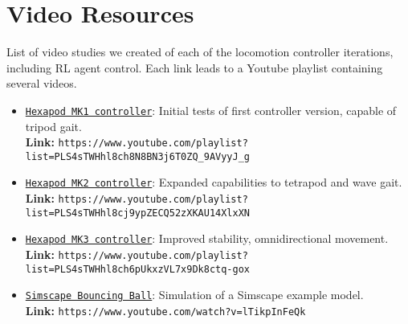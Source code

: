 \chapter*{Video Resources}

List of video studies we created of each of the locomotion controller iterations, including RL agent control.
Each link leads to a Youtube playlist containing several videos.

\begin{itemize} 
	\item \href{https://www.youtube.com/playlist?list=PLS4sTWHhl8ch8N8BN3j6T0ZQ_9AVyyJ_g}{\texttt{Hexapod MK1 controller}}: Initial tests of first controller version, capable of tripod gait. \\
																						  \textbf{Link:} \nolinkurl{https://www.youtube.com/playlist?list=PLS4sTWHhl8ch8N8BN3j6T0ZQ_9AVyyJ_g} \label{vid: MK1}
	
	\item \href{https://www.youtube.com/playlist?list=PLS4sTWHhl8cj9ypZECQ52zXKAU14XlxXN}{\texttt{Hexapod MK2 controller}}: Expanded capabilities to tetrapod and wave gait. \\
																						  \textbf{Link:} \nolinkurl{https://www.youtube.com/playlist?list=PLS4sTWHhl8cj9ypZECQ52zXKAU14XlxXN} \label{vid: MK2}
	
	\item \href{https://www.youtube.com/playlist?list=PLS4sTWHhl8ch6pUkxzVL7x9Dk8ctq-gox}{\texttt{Hexapod MK3 controller}}: Improved stability, omnidirectional movement. \\
																						  \textbf{Link:} \nolinkurl{https://www.youtube.com/playlist?list=PLS4sTWHhl8ch6pUkxzVL7x9Dk8ctq-gox} \label{vid: MK3}
	
	\item \href{https://www.youtube.com/watch?v=lTikpInFeQk}{\texttt{Simscape Bouncing Ball}}: Simulation of a Simscape example model. \\
															 \textbf{Link:} \nolinkurl{https://www.youtube.com/watch?v=lTikpInFeQk} \label{vid: Simscape}
\end{itemize}